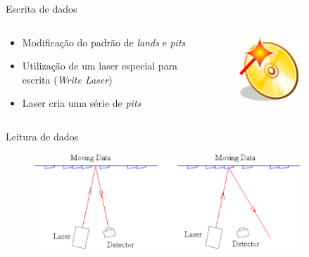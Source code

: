 \documentclass[aspectratio=169,
				xcolor=table]{beamer}
\begin{document}
	\begin{frame}{Escrita de dados}
		\begin{columns}
			\begin{column}{0.5\textwidth}
		\begin{itemize}
			\item Modificação do padrão de \textit{lands} e \textit{pits}
			\vspace{1em}
			\item Utilização de um laser especial para escrita (\textit{Write Laser})
			\vspace{1em}
			\item Laser cria uma série de \textit{pits}
		\end{itemize}			
			\end{column}
			\begin{column}{0.5\textwidth}
		\begin{figure}[hbtp]
			\centering
			\includegraphics[width=0.7\textwidth, keepaspectratio]{../figs/cap08/cdburn}
		\end{figure}			
			\end{column}
		\end{columns}
	\end{frame}
	
	\begin{frame}{Leitura de dados}
		\begin{figure}[hbtp]
			\centering
			\includegraphics[width=0.9\textwidth, keepaspectratio]{../figs/cap08/cdreading}
		\end{figure}			
	\end{frame}
	
\end{document}
